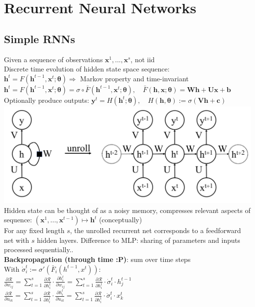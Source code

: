 \section*{Recurrent Neural Networks}
\subsection*{Simple RNNs}
Given a sequence of observations $\mathbf x^1,...,\mathbf x^s$, not iid\\
Discrete time evolution of hidden state space sequence: \\$\mathbf h^t=F(\mathbf h^{t-1},\mathbf x^t;\pmb\theta) \Rightarrow$ Markov property and time-invariant\\
$\mathbf h^{t}=F(\mathbf h^{t-1},\mathbf x^{t};\pmb\theta)=\sigma\circ\bar F(\mathbf h^{t-1},\mathbf x^{t};\pmb\theta), \quad \bar F(\mathbf h, \mathbf x; \pmb\theta)=\mathbf{Wh+Ux+b}$\\
Optionally produce outputs: $\mathbf y^t=H(\mathbf h^t;\pmb\theta), \quad H(\mathbf h, \pmb\theta):=\sigma(\mathbf{Vh+c})$
\includegraphics[width=0.9\linewidth]{rnn_unrolled.png}
\\Hidden state can be thought of as a noisy memory, compresses relevant aspects of sequence: $(\mathbf x^1,...,\mathbf x^{t-1})\mapsto \mathbf h^t$ (conceptually)\\
 For any fixed length $s$, the unrolled recurrent net corresponds to a feedforward net with $s$ hidden layers. Difference to MLP: sharing of parameters and inputs processed sequentially..\\
\textbf{Backpropagation (through time :P)}: sum over time steps\\
With $\dot\sigma_i^t:=\sigma'(\bar F_i(h^{t-1},x^t))$:\\
$\frac{\partial\mathcal R}{\partial w_{ij}}=\sum_{t=1}^s\frac{\partial\mathcal R}{\partial h_i^t}\cdot\frac{\partial h_i^t}{\partial w_{ij}}=\sum_{t=1}^s\frac{\partial\mathcal R}{\partial h_i^t}\cdot\dot\sigma_i^t\cdot h_j^{t-1}$\\
$\frac{\partial\mathcal R}{\partial u_{ik}}=\sum_{t=1}^s\frac{\partial\mathcal R}{\partial h_i^t}\cdot\frac{\partial h_i^t}{\partial u_{ik}}=\sum_{t=1}^s\frac{\partial\mathcal R}{\partial h_i^t}\cdot\dot\sigma_i^t\cdot x_k^{t}$\\
